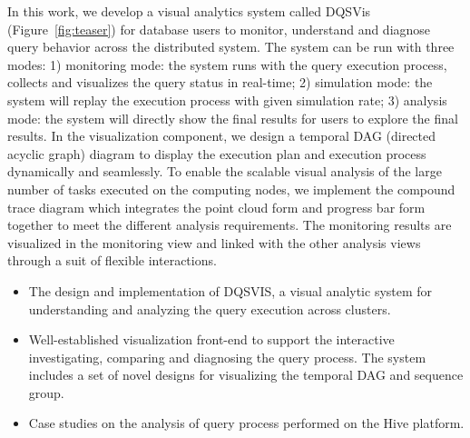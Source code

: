 In this work, we develop a visual analytics system called DQSVis (Figure~\ref{fig:teaser}) for database users to monitor, understand and diagnose query behavior across the distributed system. The system can be run with three modes: 1) monitoring mode: the system runs with the query execution process, collects and visualizes the query status in real-time; 2) simulation mode: the system will replay the execution process with given simulation rate; 3) analysis mode: the system will directly show the final results for users to explore the final results. In the visualization component, we design a temporal DAG (directed acyclic graph) diagram to display the execution plan and execution process dynamically and seamlessly. To enable the scalable visual analysis of the large number of tasks executed on the computing nodes, we implement the compound trace diagram which integrates the point cloud form and progress bar form together to meet the different analysis requirements. The monitoring results are visualized in the monitoring view and linked with the other analysis views through a suit of flexible interactions. 


\begin{itemize}
\item The design and implementation of DQSVIS, a visual analytic system for understanding and analyzing the query execution across clusters.
\item Well-established visualization front-end to support the interactive investigating, comparing and diagnosing the query process. The system includes a set of novel designs for visualizing the temporal DAG and sequence group.
\item Case studies on the analysis of query process performed on the Hive platform.
\end{itemize}